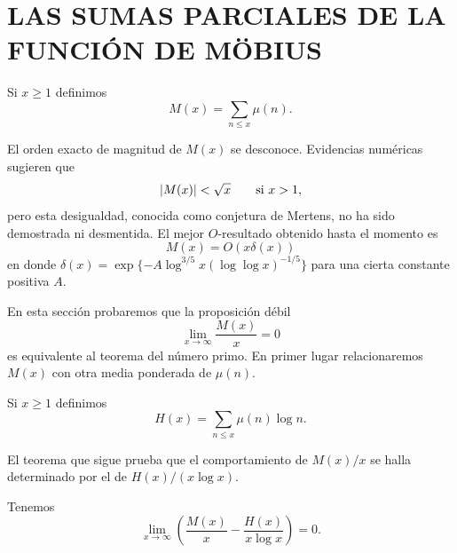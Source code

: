 \documentclass[12pt,a4paper]{book}
\begin{document}
    \section{LAS SUMAS PARCIALES DE LA FUNCIÓN DE MÖBIUS}

    \begin{definicion}
        Si $x\geq1$ definimos
        \begin{equation*}
            M(x)=\sum_{n\leq x}\mu(n).
        \end{equation*}
    \end{definicion}

    El orden exacto de magnitud de $M(x)$ se desconoce. Evidencias numéricas sugieren
    que
    \begin{equation*}
        \abs{M(x)}<\sqrt{x}\qquad\text{si } x>1,
    \end{equation*}
    pero esta desigualdad, conocida como conjetura de Mertens, no ha sido demostrada
    ni desmentida. El mejor $O$-resultado obtenido hasta el momento es
    \begin{equation*}
        M(x)=O(x\delta(x))
    \end{equation*}
    en donde $\delta(x)=\exp\{-A\log^{3/5}x(\log\log x)^{-1/5}\}$ para una cierta
    constante positiva $A$.

    En esta sección probaremos que la proposición débil
    \begin{equation*}
        \lim_{x\to\infty}\frac{M(x)}{x}=0
    \end{equation*}
    es equivalente al teorema del número primo. En primer lugar relacionaremos $M(x)$
    con otra media ponderada de $\mu(n)$.

    \begin{definicion}
        Si $x\geq1$ definimos
        \begin{equation*}
            H(x)=\sum_{n\leq x}\mu(n)\log n.
        \end{equation*}
    \end{definicion}

    El teorema que sigue prueba que el comportamiento de $M(x)/x$ se halla
    determinado por el de $H(x)/(x\log x)$.

    \begin{teorema}
        Tenemos
        \begin{equation}
            \lim_{x\to\infty}\left(\frac{M(x)}{x}-\frac{H(x)}{x\log x}\right)=0.
        \end{equation}
    \end{teorema}
\end{document}
